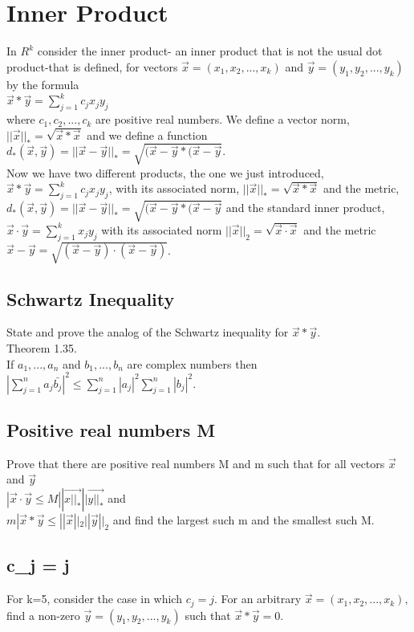 \section{Inner Product}
In $R^k$ consider the inner product- an inner product that is not the usual dot product-that is defined, for vectors $\vec{x}=(x_1, x_2,..., x_k)$ and $\vec{y}=(y_1,y_2,...,y_k)$ by the formula \\ 
$\vec{x}*\vec{y}= \sum_{j=1}^k c_j x_j y_j$ \\ where $c_1,c_2,...,c_k$ are positive real numbers. We define a vector norm, $||\vec{x}||_{*}=\sqrt{\vec{x}*\vec{x}}$ and we define a function $d_*(\vec{x},\vec{y})=||\vec{x}-\vec{y}||_{*}=\sqrt{(\vec{x}-\vec{y}*(\vec{x}-\vec{y}}.$\\ 
Now we have two different products, the one we just introduced, $\vec{x}*\vec{y}= \sum_{j=1}^k c_j x_j y_j$, with its associated norm, $||\vec{x}||_{*}=\sqrt{\vec{x}*\vec{x}}$ and the metric, $d_*(\vec{x},\vec{y})=||\vec{x}-\vec{y}||_{*}=\sqrt{(\vec{x}-\vec{y}*(\vec{x}-\vec{y}}$ and the standard inner product, $\vec{x}\cdot \vec{y}= \sum_{j=1}^k x_j y_j$ with its associated norm $||\vec{x}||_{2}=\sqrt{\vec{x}\cdot \vec{x}}$ and the metric $\vec{x}-\vec{y}=\sqrt{(\vec{x}-\vec{y})\cdot (\vec{x}-\vec{y})}$. \\ 
\subsection{Schwartz Inequality}
State and prove the analog of the Schwartz inequality for $\vec{x}*\vec{y}.$ \\ 
Theorem 1.35. \\ 
If $a_1,...,a_n$ and $b_1,...,b_n$ are complex numbers then $|\sum_{j=1}^n a_j \bar{b_j}|^2 \leq \sum_{j=1}^n |a_j|^2 \sum_{j=1}^n |b_j|^2.$ \\ 

\subsection{Positive real numbers M} 
Prove that there are positive real numbers M and m such that for all vectors $\vec{x}$ and $\vec{y}$ \\ 
$|\vec{x}\cdot \vec{y}\leq M ||\vec{x||_{*}}||\vec{y||_{*}}$ and \\ $m|\vec{x}*\vec{y}\leq ||\vec{x}||_2||\vec{y}||_2$ and find the largest such m and the smallest such M. \\ 
\subsection{c_j = j} 
For k=5, consider the case in which $c_j=j.$ For an arbitrary $\vec{x}=(x_1,x_2,...,x_k),$ find a non-zero $\vec{y}=(y_1,y_2,...,y_k)$ such that $\vec{x}*\vec{y}=0.$ \\ 
